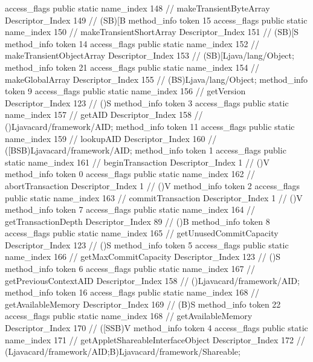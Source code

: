 {{{{{					access_flags	public static
					name_index	148		// makeTransientByteArray
					Descriptor_Index	149		// (SB)[B
				}
				method_info {
					token	15
					access_flags	public static
					name_index	150		// makeTransientShortArray
					Descriptor_Index	151		// (SB)[S
				}
				method_info {
					token	14
					access_flags	public static
					name_index	152		// makeTransientObjectArray
					Descriptor_Index	153		// (SB)[Ljava/lang/Object;
				}
				method_info {
					token	21
					access_flags	public static
					name_index	154		// makeGlobalArray
					Descriptor_Index	155		// (BS)Ljava/lang/Object;
				}
				method_info {
					token	9
					access_flags	public static
					name_index	156		// getVersion
					Descriptor_Index	123		// ()S
				}
				method_info {
					token	3
					access_flags	public static
					name_index	157		// getAID
					Descriptor_Index	158		// ()Ljavacard/framework/AID;
				}
				method_info {
					token	11
					access_flags	public static
					name_index	159		// lookupAID
					Descriptor_Index	160		// ([BSB)Ljavacard/framework/AID;
				}
				method_info {
					token	1
					access_flags	public static
					name_index	161		// beginTransaction
					Descriptor_Index	1		// ()V
				}
				method_info {
					token	0
					access_flags	public static
					name_index	162		// abortTransaction
					Descriptor_Index	1		// ()V
				}
				method_info {
					token	2
					access_flags	public static
					name_index	163		// commitTransaction
					Descriptor_Index	1		// ()V
				}
				method_info {
					token	7
					access_flags	public static
					name_index	164		// getTransactionDepth
					Descriptor_Index	89		// ()B
				}
				method_info {
					token	8
					access_flags	public static
					name_index	165		// getUnusedCommitCapacity
					Descriptor_Index	123		// ()S
				}
				method_info {
					token	5
					access_flags	public static
					name_index	166		// getMaxCommitCapacity
					Descriptor_Index	123		// ()S
				}
				method_info {
					token	6
					access_flags	public static
					name_index	167		// getPreviousContextAID
					Descriptor_Index	158		// ()Ljavacard/framework/AID;
				}
				method_info {
					token	16
					access_flags	public static
					name_index	168		// getAvailableMemory
					Descriptor_Index	169		// (B)S
				}
				method_info {
					token	22
					access_flags	public static
					name_index	168		// getAvailableMemory
					Descriptor_Index	170		// ([SSB)V
				}
				method_info {
					token	4
					access_flags	public static
					name_index	171		// getAppletShareableInterfaceObject
					Descriptor_Index	172		// (Ljavacard/framework/AID;B)Ljavacard/framework/Shareable;
}}}}}
